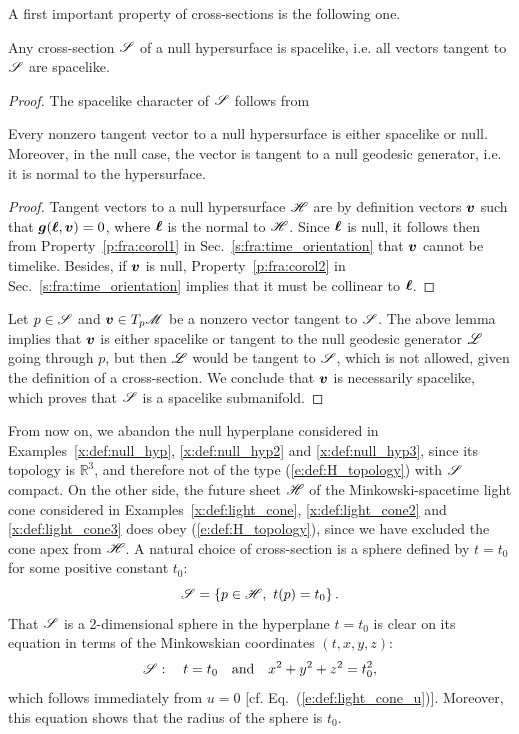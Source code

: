 A first important property of cross-sections is the following one.
\begin{prop}
Any cross-section $\mathscr{S}$ of a null hypersurface is spacelike,
i.e. all vectors tangent to $\mathscr{S}$ are spacelike.
\end{prop}
\begin{proof}
The spacelike character of $\mathscr{S}$ follows from
\begin{lemma}
\label{p:def:tangent_to_null_hyp}
Every nonzero tangent vector to a null hypersurface is either spacelike or null.
Moreover, in the null case, the vector is tangent to a null geodesic generator, i.e. it is normal
to the hypersurface.
\end{lemma}
\begin{proof}
Tangent vectors to a null hypersurface $\mathscr{H}$ are by definition
vectors $\bm{v}$ such that $\bm{g}(\bm{\ell},\bm{v})=0$, where $\bm{\ell}$ is the normal
to $\mathscr{H}$. Since $\bm{\ell}$ is null, it follows then from Property~\ref{p:fra:corol1}
in Sec.~\ref{s:fra:time_orientation} that $\bm{v}$ cannot be timelike.
Besides, if $\bm{v}$ is null, Property~\ref{p:fra:corol2} in Sec.~\ref{s:fra:time_orientation}
implies that it must be collinear to $\bm{\ell}$.
\end{proof}
Let $p \in \mathscr{S}$ and $\bm{v}\in T_p\mathscr{M}$ be a nonzero vector tangent to $\mathscr{S}$.
The above lemma implies that $\bm{v}$ is either spacelike or tangent to the
null geodesic generator $\mathscr{L}$ going through $p$, but then $\mathscr{L}$ would be tangent to $\mathscr{S}$,
which is not allowed, given the definition of a cross-section. We conclude
that $\bm{v}$ is necessarily spacelike, which proves that $\mathscr{S}$ is a spacelike
submanifold.
\end{proof}

\begin{example} \label{x:def:light_cone4}
From now on, we abandon the null hyperplane considered in Examples~\ref{x:def:null_hyp},
\ref{x:def:null_hyp2} and \ref{x:def:null_hyp3}, since its topology is $\mathbb{R}^3$,
and therefore not of the type (\ref{e:def:H_topology}) with $\mathscr{S}$ compact.
On the other side, the future sheet $\mathscr{H}$ of the Minkowski-spacetime light cone considered in Examples~\ref{x:def:light_cone},
\ref{x:def:light_cone2} and \ref{x:def:light_cone3} does obey (\ref{e:def:H_topology}),
since we have excluded the cone apex from $\mathscr{H}$.
A natural choice of cross-section is a sphere defined by $t=t_0$ for some positive constant $t_0$:
\[
    \mathscr{S} = \left\{ p \in \mathscr{H},\  t(p) = t_0 \right\} .
\]
That $\mathscr{S}$ is a 2-dimensional sphere in the hyperplane $t=t_0$ is clear on its equation in terms
of the Minkowskian coordinates $(t,x,y,z)$:
\[
\mathscr{S}: \quad t=t_0 \quad\mbox{and}\quad x^2+y^2+z^2 = t_0^2,
\]
which follows immediately from $u=0$
[cf. Eq.~(\ref{e:def:light_cone_u})]. Moreover, this equation shows that the
radius of the sphere is $t_0$.
\end{example}

